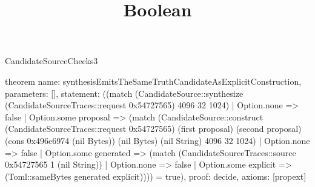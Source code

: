 \begin{lexlean}{CandidateSourceChecks3}
\title{Boolean}
\begin{semanticmodule}
theorem{
 name: synthesisEmitsTheSameTruthCandidateAsExplicitConstruction,
 parameters: [],
 statement: ((match (CandidateSource::synthesize (CandidateSourceTraces::request 0x54727565) 4096 32 1024) | Option.none => false | Option.some proposal => (match (CandidateSource::construct (CandidateSourceTraces::request 0x54727565) (first proposal) (second proposal) (cons 0x496e6974 (nil Bytes)) (nil Bytes) (nil String) 4096 32 1024) | Option.none => false | Option.some generated => (match (CandidateSourceTraces::source 0x54727565 1 (nil String)) | Option.none => false | Option.some explicit => (Toml::sameBytes generated explicit)))) = true),
 proof: decide{},
 axioms: [propext]
}
\end{semanticmodule}
\end{lexlean}
